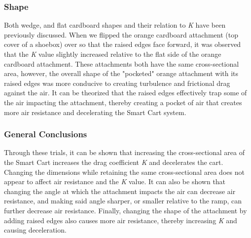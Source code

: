 \subsubsection{Shape}
Both wedge, and flat cardboard shapes and their relation to \textit{K} have been previously discussed. When we flipped
the orange cardboard attachment (top cover of a shoebox) over so that the raised edges face forward, it was observed that the
\textit{K} value slightly increased relative to the flat side of the orange cardboard attachment. These attachments both have the
same cross-sectional area, however, the overall shape of the "pocketed" orange attachment with its raised edges was more
conducive to creating turbulence and frictional drag against the air. It can be theorized that the raised edges effectively
trap some of the air impacting the attachment, thereby creating a pocket of air that creates more air resistance and decelerating the Smart Cart system.

\subsubsection{General Conclusions}
Through these trials, it can be shown that increasing the cross-sectional area of the Smart Cart increases the drag coefficient \textit{K}
and decelerates the cart. Changing the dimensions while retaining the same cross-sectional area does not appear
to affect air resistance and the \textit{K} value. It can also be shown that changing the angle at which the attachment impacts the air can
decrease air resistance, and making said angle sharper, or smaller relative to the ramp, can further decrease air resistance.
Finally, changing the shape of the attachment by adding raised edges also causes more air resistance, thereby increasing \textit{K} and
causing deceleration.